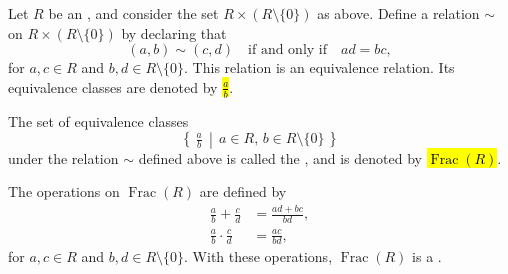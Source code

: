 \begin{definition} \label{definition:field_of_fractions_of_an_integral_domain}
    Let $R$ be an , and consider the set $R \times (R \setminus \{0\})$ as above. Define a relation $\sim$ on $R \times (R \setminus \{0\})$ by declaring that
    $$(a,b) \sim (c,d) \quad \text{if and only if} \quad ad = bc,$$
    for $a,c \in R$ and $b,d \in R \setminus \{0\}$.  
    This relation is an equivalence relation. Its equivalence classes are denoted by
    \hl{$\tfrac{a}{b}$}.

    The set of equivalence classes
    $$\left\{\, \tfrac{a}{b} \,\middle|\, a \in R, \, b \in R \setminus \{0\} \,\right\}$$
    under the relation $\sim$ defined above is called the , and is denoted by \hl{$\operatorname{Frac}(R)$}.  

    The operations on $\operatorname{Frac}(R)$ are defined by
    \begin{align*}
    \tfrac{a}{b} + \tfrac{c}{d} &= \tfrac{ad+bc}{bd}, \\
    \tfrac{a}{b} \cdot \tfrac{c}{d} &= \tfrac{ac}{bd},
    \end{align*}
    for $a,c \in R$ and $b,d \in R \setminus \{0\}$.
    With these operations, $\operatorname{Frac}(R)$ is a .

\end{definition}
